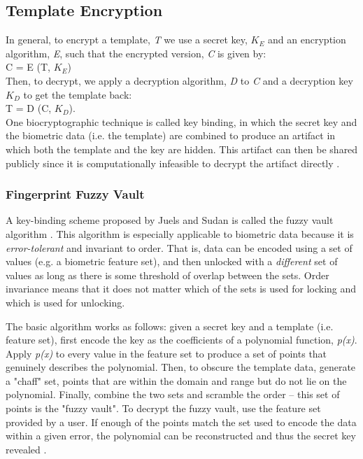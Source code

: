 \documentclass[11pt]{article}
\begin{document}
\subsection{Template Encryption}
In general, to encrypt a template, \textit{T} we use a secret key, \textit{$K_E$}
and an encryption algorithm, \textit{E}, such that the encrypted version, 
\textit{C} is given by: \\
\indent C = E (T, $K_E$)
\\ Then, to decrypt, we apply a decryption algorithm, \textit{D} to \textit{C} 
and a decryption key \textit{$K_D$} to get the template back: \\
\indent T = D (C, $K_D$).
\\One biocryptographic technique is called key binding, in which the secret key
and the biometric data (i.e. the template) are combined to produce an artifact
in which both the template and the key are hidden. This artifact can then be
shared publicly since it is computationally infeasible to decrypt the artifact
directly \cite{Biocryptography10}.

\subsubsection{Fingerprint Fuzzy Vault}
A key-binding scheme proposed by Juels and Sudan is called the fuzzy vault 
algorithm \cite{Juels:2006:FVS:1110940.1110956}. This algorithm is especially
applicable to biometric data because it is \textit{error-tolerant} and 
invariant to order. That is, data can be encoded using a set of values (e.g. a
biometric feature set), and then unlocked with a \textit{different} set of 
values as long as there is some threshold of overlap between the sets. Order
invariance means that it does not matter which of the sets is used for 
locking and which is used for unlocking.

The basic algorithm works as follows: given a secret key and a template (i.e.
feature set), first encode the key as the coefficients of a polynomial function,
\textit{p(x)}. Apply \textit{p(x)} to every value in the feature set to 
produce a set of points that genuinely describes the polynomial. Then, to obscure
the template data, generate a "chaff" set, points that are within the domain
and range but do not lie on the polynomial. Finally, combine the two sets and 
scramble the order -- this set of points is the "fuzzy vault".
To decrypt the fuzzy vault, use the feature set provided by a user. If enough
of the points match the set used to encode the data within a given error, the
polynomial can be reconstructed and thus the secret key revealed \cite{Biocryptography10,Juels:2006:FVS:1110940.1110956}. 
\end{document}
